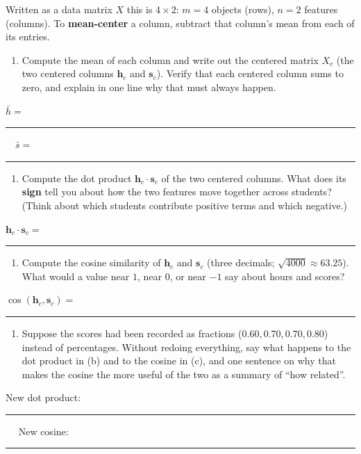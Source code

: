 \documentclass[
  11pt,
]{article}
\providecommand{\tightlist}{%
  \setlength{\itemsep}{0pt}\setlength{\parskip}{0pt}}
\newcommand{\answerspace}[1]{\par\vspace*{#1}}  %
\newcommand{\blank}[1][1.2in]{\rule{#1}{0.4pt}}
\begin{document}
Written as a data matrix \(X\) this is \(4\times 2\): \(m=4\) objects
(rows), \(n=2\) features (columns). To \textbf{mean-center} a column,
subtract that column's mean from each of its entries.

\begin{enumerate}
\def\labelenumi{(\alph{enumi})}
\tightlist
\item
  Compute the mean of each column and write out the centered matrix
  \(X_c\) (the two centered columns \(\mathbf{h}_c\) and
  \(\mathbf{s}_c\)). Verify that each centered column sums to zero, and
  explain in one line why that must always happen.
\end{enumerate}

\(\bar h =\) \blank[0.8in] \(\quad \bar s =\) \blank[0.8in]

\answerspace{2.2in}

\begin{enumerate}
\def\labelenumi{(\alph{enumi})}
\setcounter{enumi}{1}
\tightlist
\item
  Compute the dot product \(\mathbf{h}_c\cdot\mathbf{s}_c\) of the two
  centered columns. What does its \textbf{sign} tell you about how the
  two features move together across students? (Think about which
  students contribute positive terms and which negative.)
\end{enumerate}

\(\mathbf{h}_c\cdot\mathbf{s}_c =\) \blank[0.8in]

\answerspace{1.6in}

\begin{enumerate}
\def\labelenumi{(\alph{enumi})}
\setcounter{enumi}{2}
\tightlist
\item
  Compute the cosine similarity of \(\mathbf{h}_c\) and \(\mathbf{s}_c\)
  (three decimals; \(\sqrt{4000} \approx 63.25\)). What would a value
  near \(1\), near \(0\), or near \(-1\) say about hours and scores?
\end{enumerate}

\(\cos(\mathbf{h}_c,\mathbf{s}_c) =\) \blank[0.8in]

\answerspace{1.8in}

\begin{enumerate}
\def\labelenumi{(\alph{enumi})}
\setcounter{enumi}{3}
\tightlist
\item
  Suppose the scores had been recorded as fractions
  (\(0.60, 0.70, 0.70, 0.80\)) instead of percentages. Without redoing
  everything, say what happens to the dot product in (b) and to the
  cosine in (c), and one sentence on why that makes the cosine the more
  useful of the two as a summary of ``how related''.
\end{enumerate}

New dot product: \blank[0.8in] \(\quad\) New cosine: \blank[0.8in]

\answerspace{1.5in}
\end{document}
